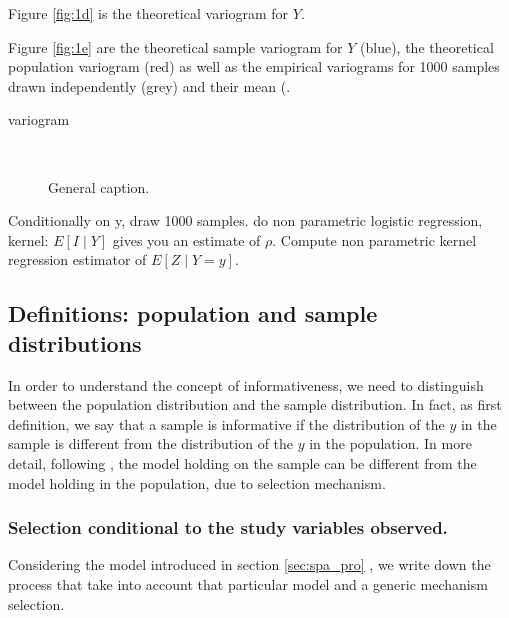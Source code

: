 \documentclass[12pt]{article}
\theoremstyle{definition}
\theoremstyle{remark}
\newcommand{\Signal}{Y}
\begin{document}
Figure \ref{fig:1d} is the theoretical variogram for $\Signal$.

Figure \ref{fig:1e} are the theoretical sample variogram for $\Signal$ (blue), the theoretical population variogram (red) as well as the empirical variograms for 1000 samples drawn independently (grey) and their mean (.

variogram 


\begin{figure}[H]
\centering
\subfigure[Population.]{
%
}\label{fig:1a}
\label{fig:1b}
\label{fig:1c}
\\


\subfigure[1000 Variograms $C$.] {
%
}\label{fig:1d}
\subfigure[Variogram $C$.]{
%
}\label{fig:1e}

\caption{General caption.} \label{fig:1}


\end{figure}

Conditionally on y, draw 1000 samples.
do non parametric logistic regression,
kernel: $E[I\mid Y]$ gives you an estimate of $\rho$.
Compute non parametric kernel regression estimator of $E[Z\mid Y=y]$.

\subsection{Definitions: population and sample distributions} 
In order to understand the concept of informativeness, we need to distinguish between the population distribution and the sample distribution. In fact, as first definition, we say that a sample is informative if the distribution of the $y$ in the sample is different from the distribution of the $y$ in the population. In more detail, following \cite{pfefferman_1992}, the model holding on the sample can be different from the model holding in the population, due to selection mechanism.

\subsubsection{Selection conditional to the study variables observed.}

Considering the model introduced in section \ref{sec:spa_pro} , we write down the process that take into account that particular model and a generic mechanism selection.
\end{document}
